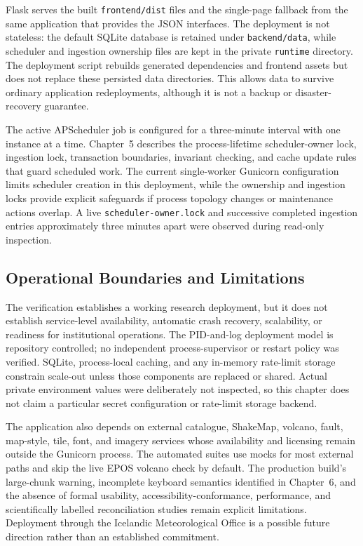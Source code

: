 \documentclass[12pt]{article}
\begin{document}
Flask serves the built \texttt{frontend/dist} files and the single-page fallback from the same application that provides the JSON interfaces. The deployment is not stateless: the default SQLite database is retained under \texttt{backend/data}, while scheduler and ingestion ownership files are kept in the private \texttt{runtime} directory. The deployment script rebuilds generated dependencies and frontend assets but does not replace these persisted data directories. This allows data to survive ordinary application redeployments, although it is not a backup or disaster-recovery guarantee.

The active APScheduler job is configured for a three-minute interval with one instance at a time. Chapter~5 describes the process-lifetime scheduler-owner lock, ingestion lock, transaction boundaries, invariant checking, and cache update rules that guard scheduled work. The current single-worker Gunicorn configuration limits scheduler creation in this deployment, while the ownership and ingestion locks provide explicit safeguards if process topology changes or maintenance actions overlap. A live \texttt{scheduler-owner.lock} and successive completed ingestion entries approximately three minutes apart were observed during read-only inspection.

\subsection{Operational Boundaries and Limitations}

The verification establishes a working research deployment, but it does not establish service-level availability, automatic crash recovery, scalability, or readiness for institutional operations. The PID-and-log deployment model is repository controlled; no independent process-supervisor or restart policy was verified. SQLite, process-local caching, and any in-memory rate-limit storage constrain scale-out unless those components are replaced or shared. Actual private environment values were deliberately not inspected, so this chapter does not claim a particular secret configuration or rate-limit storage backend.

The application also depends on external catalogue, ShakeMap, volcano, fault, map-style, tile, font, and imagery services whose availability and licensing remain outside the Gunicorn process. The automated suites use mocks for most external paths and skip the live EPOS volcano check by default. The production build's large-chunk warning, incomplete keyboard semantics identified in Chapter~6, and the absence of formal usability, accessibility-conformance, performance, and scientifically labelled reconciliation studies remain explicit limitations. Deployment through the Icelandic Meteorological Office is a possible future direction rather than an established commitment.
\end{document}
